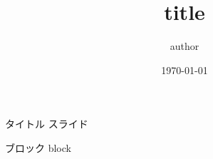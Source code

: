\documentclass[unicode,aspectratio=169]{beamer} %
\title{title}
\author{author}
\date{\today}
\begin{document}
\maketitle

\begin{frame}{タイトル}
    スライド
    \begin{block}{ブロック}
        block
    \end{block}
\end{frame}
\end{document}
